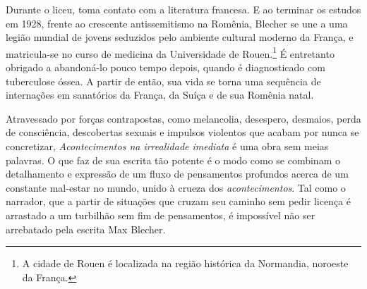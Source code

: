 Durante o liceu, toma contato com a literatura francesa. E ao terminar os estudos em 1928, frente ao crescente antissemitismo na Romênia, Blecher se une a uma legião mundial de jovens seduzidos pelo ambiente cultural moderno da França, e matricula-se no curso de medicina da Universidade de Rouen.\footnote{A cidade de Rouen é localizada na região histórica da Normandia, noroeste da França.} É entretanto obrigado a abandoná-lo pouco tempo depois, quando é diagnosticado com tuberculose óssea. A partir de então, sua vida se torna uma sequência de internações em sanatórios da França, da Suíça e de sua Romênia natal.
	

Atravessado por forças contrapostas, como melancolia, desespero, desmaios, perda de consciência, descobertas sexuais e impulsos violentos que acabam por nunca se concretizar, \textit{Acontecimentos na irrealidade imediata} é uma obra sem meias palavras. O que faz de sua escrita tão potente é o modo como se combinam o detalhamento e expressão de um fluxo de pensamentos profundos acerca de um constante mal-estar no mundo, unido à crueza dos \textit{acontecimentos}. Tal como o narrador, que a partir de situações que cruzam seu caminho sem pedir licença é arrastado a um turbilhão sem fim de pensamentos, é impossível não ser arrebatado pela escrita Max Blecher.